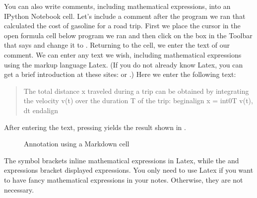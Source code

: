 \documentclass[letterpaper,10pt,english]{sphinxmanual}
\begin{document}
\sphinxAtStartPar
You can also write comments, including mathematical expressions, into an IPython Notebook cell.  Let’s include a comment after the program we ran that calculated the cost of gasoline for a road trip.  First we place the cursor in the open formula cell below program we ran and then click on the box in the Toolbar that says  and change it to .  Returning to the cell, we enter the text of our comment.  We can enter any text we wish, including mathematical expressions using the markup language Latex.  (If you do not already know Latex, you can get a brief introduction at these sites:  or .)  Here we enter the following text:
\begin{quote}

\begin{sphinxVerbatim}[commandchars=\\\{\},numbers=left,firstnumber=1,stepnumber=1]
The total distance \PYGZdl{}x\PYGZdl{} traveled during a trip can be
obtained by integrating the velocity \PYGZdl{}v(t)\PYGZdl{} over the
duration \PYGZdl{}T\PYGZdl{} of the trip:
\PYGZbs{}begin\PYGZob{}align\PYGZcb{}
    x = \PYGZbs{}int\PYGZus{}0\PYGZca{}T v(t)\PYGZbs{}, dt
\PYGZbs{}end\PYGZob{}align\PYGZcb{}
\end{sphinxVerbatim}
\end{quote}

\sphinxAtStartPar
After entering the text, pressing  yields the result shown in {\hyperref[\detokenize{apdx2/apdx2_ipynb:fig-markdown}]{}}.

\begin{figure}[htbp]
\centering
\capstart

\noindent{}
\caption{Annotation using a Markdown cell}\label{\detokenize{apdx2/apdx2_ipynb:id6}}\label{\detokenize{apdx2/apdx2_ipynb:fig-markdown}}\end{figure}

\sphinxAtStartPar
The \sphinxcode{\sphinxupquote{\$}} symbol brackets inline mathematical expressions in Latex, while the  and  expressions bracket displayed expressions.  You only need to use Latex if you want to have fancy mathematical expressions in your notes.  Otherwise, they are not necessary.
\end{document}
